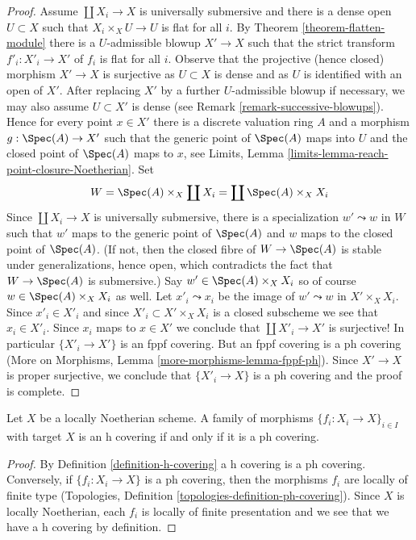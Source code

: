 \begin{proof}
\medskip\noindent
Assume $\coprod X_i \to X$ is universally submersive and
there is a dense open $U \subset X$ such that
$X_i \times_X U \to U$ is flat for all $i$.
By Theorem \ref{theorem-flatten-module}
there is a $U$-admissible blowup $X' \to X$ such that
the strict transform $f'_i : X'_i \to X'$ of $f_i$ is flat for all $i$.
Observe that the projective (hence closed) morphism $X' \to X$
is surjective as $U \subset X$ is dense and as $U$ is identified
with an open of $X'$. After replacing $X'$ by a further
$U$-admissible blowup if necessary, we may also assume $U \subset X'$ is dense
(see Remark \ref{remark-successive-blowups}).
Hence for every point $x \in X'$ there is a discrete valuation ring $A$
and a morphism $g : \Spec(A) \to X'$ such that the generic
point of $\Spec(A)$ maps into $U$ and the closed point of
$\Spec(A)$ maps to $x$, see Limits, Lemma
\ref{limits-lemma-reach-point-closure-Noetherian}.
Set
$$
W = \Spec(A) \times_X \coprod X_i = \coprod \Spec(A) \times_X X_i
$$
Since $\coprod X_i \to X$ is universally submersive,
there is a specialization $w' \leadsto w$ in $W$
such that $w'$ maps to the generic point of $\Spec(A)$
and $w$ maps to the closed point of $\Spec(A)$.
(If not, then the closed fibre of $W \to \Spec(A)$
is stable under generalizations, hence open, which
contradicts the fact that $W \to \Spec(A)$ is submersive.)
Say $w' \in \Spec(A) \times_X X_i$ so of course
$w \in \Spec(A) \times_X X_i$ as well. Let
$x'_i \leadsto x_i$ be the image of $w' \leadsto w$ in
$X' \times_X X_i$. Since $x'_i \in X'_i$ and since
$X'_i \subset X' \times_X X_i$ is a closed subscheme
we see that $x_i \in X'_i$. Since $x_i$ maps to $x \in X'$
we conclude that
$\coprod X'_i \to X'$ is surjective! In particular
$\{X'_i \to X'\}$ is an fppf covering. But an fppf covering is a ph covering
(More on Morphisms, Lemma \ref{more-morphisms-lemma-fppf-ph}).
Since $X' \to X$ is proper surjective, we conclude
that $\{X'_i \to X\}$ is a ph covering and the proof is complete.
\end{proof}

\begin{lemma}
\label{lemma-Noetherian-h-ph}
Let $X$ be a locally Noetherian scheme. A family of morphisms
$\{f_i : X_i \to X\}_{i \in I}$ with target $X$ is an h covering
if and only if it is a ph covering.
\end{lemma}

\begin{proof}
By Definition \ref{definition-h-covering} a h covering is a ph covering.
Conversely, if $\{f_i : X_i \to X\}$ is a ph covering, then the morphisms
$f_i$ are locally of finite type (Topologies, Definition
\ref{topologies-definition-ph-covering}). Since $X$ is locally Noetherian,
each $f_i$ is locally of finite presentation and we see that we have
a h covering by definition.
\end{proof}

